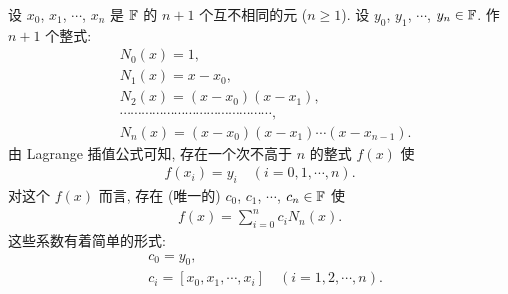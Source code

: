 \begin{proposition}
    设 $x_0$, $x_1$, $\cdots$, $x_{n}$ 是 $\mathbb{F}$ 的 $n+1$ 个互不相同的元 ($n \geq 1$). 设 $y_0$, $y_1$, $\cdots$, $y_{n} \in \mathbb{F}$. 作 $n+1$ 个整式:
    \begin{align*}
         & N_0 (x) = 1,                                          \\
         & N_1 (x) = x - x_0,                                    \\
         & N_2 (x) = (x - x_0) (x - x_1),                        \\
         & \cdots \cdots \cdots \cdots \cdots \cdots \cdots
        \cdots \cdots \cdots \cdots \cdots \cdots \cdots,        \\
         & N_{n} (x) = (x - x_0) (x - x_1) \cdots (x - x_{n-1}).
    \end{align*}
    由 Lagrange 插值公式可知, 存在一个次不高于 $n$ 的整式 $f(x)$ 使
    \begin{align*}
        f(x_i) = y_i \quad (i = 0,1,\cdots,n).
    \end{align*}
    对这个 $f(x)$ 而言, 存在 (唯一的) $c_0$, $c_1$, $\cdots$, $c_n \in \mathbb{F}$ 使
    \begin{align*}
        f(x) = \sum_{i = 0}^{n} c_i N_{n} (x).
    \end{align*}
    这些系数有着简单的形式:
    \begin{align*}
         & c_0 = y_0,                                              \\
         & c_i = [x_0, x_1, \cdots, x_i] \quad (i = 1,2,\cdots,n).
    \end{align*}
\end{proposition}

